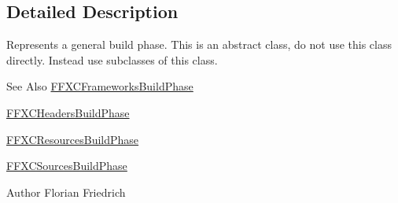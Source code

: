 \subsection{Detailed Description}
Represents a general build phase. This is an abstract class, do not use this class directly. Instead use subclasses of this class. \begin{DoxySeeAlso}{See Also}
\hyperlink{interface_f_f_x_c_frameworks_build_phase}{F\-F\-X\-C\-Frameworks\-Build\-Phase} 

\hyperlink{interface_f_f_x_c_headers_build_phase}{F\-F\-X\-C\-Headers\-Build\-Phase} 

\hyperlink{interface_f_f_x_c_resources_build_phase}{F\-F\-X\-C\-Resources\-Build\-Phase} 

\hyperlink{interface_f_f_x_c_sources_build_phase}{F\-F\-X\-C\-Sources\-Build\-Phase} 
\end{DoxySeeAlso}
\begin{DoxyAuthor}{Author}
Florian Friedrich 
\end{DoxyAuthor}


